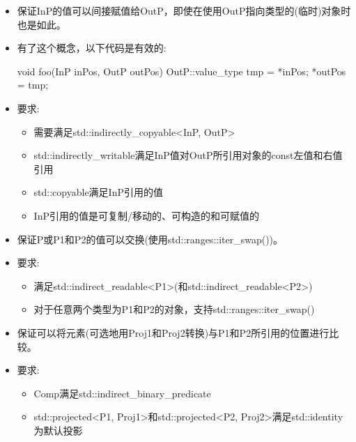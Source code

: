 \begin{itemize}
\item
保证InP的值可以间接赋值给OutP，即使在使用OutP指向类型的(临时)对象时也是如此。

\item
有了这个概念，以下代码是有效的:

\begin{cpp}
void foo(InP inPos, OutP outPos) {
	OutP::value_type tmp = *inPos;
	*outPos = tmp;
}
\end{cpp}

\item
要求:
\begin{itemize}
\item
需要满足std::indirectly\_copyable<InP, OutP> 

\item
std::indirectly\_writable满足InP值对OutP所引用对象的const左值和右值引用

\item
std::copyable满足InP引用的值

\item
InP引用的值是可复制/移动的、可构造的和可赋值的
\end{itemize}
\end{itemize}


\begin{itemize}
\item
保证P或P1和P2的值可以交换(使用std::ranges::iter\_swap())。

\item
要求:
\begin{itemize}
\item
满足std::indirect\_readable<P1>(和std::indirect\_readable<P2>)

\item
对于任意两个类型为P1和P2的对象，支持std::ranges::iter\_swap()
\end{itemize}
\end{itemize}


\begin{itemize}
\item
保证可以将元素(可选地用Proj1和Proj2转换)与P1和P2所引用的位置进行比较。

\item
要求:
\begin{itemize}
\item
Comp满足std::indirect\_binary\_predicate

\item
std::projected<P1, Proj1>和std::projected<P2, Proj2>满足std::identity为默认投影
\end{itemize}
\end{itemize}

